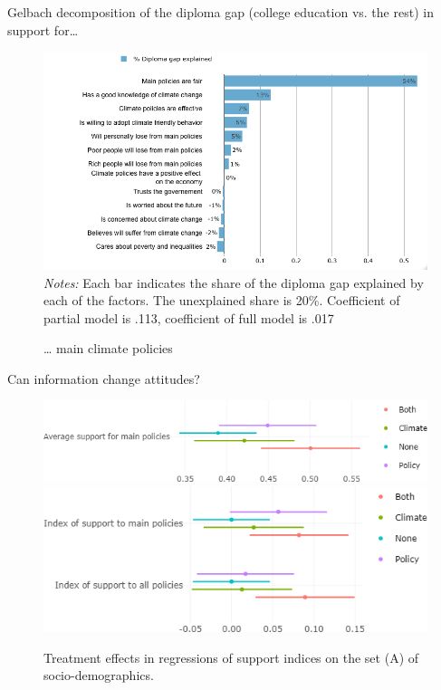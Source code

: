 \begin{framefont}{\small}
\begin{frame}{Gelbach decomposition of the diploma gap (college education vs. the rest) in support for…}%
\vspace{-.2cm}
\begin{figure}[h!]
\caption{… main climate policies}
\includegraphics[width=.65\textwidth]{../figures/FR/gelbach_college_index_main_policies} \\
{\tiny \textit{Notes:} Each bar indicates the share of the diploma gap explained by each of the factors. The unexplained share is 20\%. Coefficient of partial model is .113, coefficient of full model is .017}
\end{figure}
\end{frame}

\begin{frame}{Can information change attitudes?}
\begin{figure}
	\caption{Treatment effects in regressions of support indices on the set (A) of socio-demographics.}
	\includegraphics[width=.7\textwidth]{../figures/FR/policies_support_by_treatment.png}
	\includegraphics[width=.7\textwidth]{../figures/FR/indices_policies_by_treatment_origin0.png}
\end{figure}
\end{frame}


\end{framefont}
